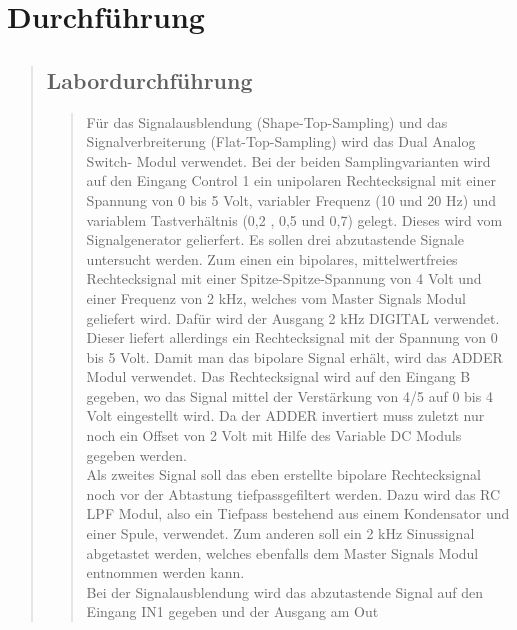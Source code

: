 

\section{Durchführung}
\begin{quote}
    
    
    \subsection{Labordurchführung}
    \begin{quote}
        Für das Signalausblendung (Shape-Top-Sampling) und das Signalverbreiterung (Flat-Top-Sampling) wird das Dual
        Analog Switch- Modul verwendet.
        Bei der beiden Samplingvarianten wird auf den Eingang Control 1 ein unipolaren Rechtecksignal mit einer Spannung
        von 0 bis 5 Volt, variabler Frequenz (10 und 20 Hz) und variablem Tastverhältnis (0,2 , 0,5 und 0,7) gelegt.
        Dieses wird vom Signalgenerator gelierfert.
        Es sollen drei abzutastende Signale untersucht werden. Zum einen ein bipolares, mittelwertfreies Rechtecksignal
        mit einer Spitze-Spitze-Spannung von 4 Volt und einer Frequenz von 2 kHz, welches vom Master Signals Modul
        geliefert wird. Dafür wird der Ausgang 2 kHz DIGITAL verwendet. Dieser liefert allerdings ein Rechtecksignal mit
        der Spannung von 0 bis 5 Volt. Damit man das bipolare Signal erhält, wird das ADDER Modul verwendet. Das
        Rechtecksignal wird auf den Eingang B gegeben, wo das Signal mittel der Verstärkung von 4/5 auf 0 bis 4 Volt
        eingestellt wird. Da der ADDER invertiert muss zuletzt nur noch ein Offset von 2 Volt mit Hilfe des Variable DC
        Moduls gegeben werden.\\
        \noindent\hspace*{4mm}
        Als zweites Signal soll das eben erstellte bipolare Rechtecksignal noch vor der Abtastung tiefpassgefiltert
        werden. Dazu wird das RC LPF Modul, also ein Tiefpass bestehend aus einem Kondensator und einer Spule,
        verwendet.
        Zum anderen soll ein 2 kHz Sinussignal abgetastet werden, welches ebenfalls dem Master Signals Modul entnommen
        werden kann.\\
        \noindent\hspace*{4mm}
        Bei der Signalausblendung wird das abzutastende Signal auf den Eingang IN1 gegeben und der Ausgang am Out

\end{quote}
\end{quote}
